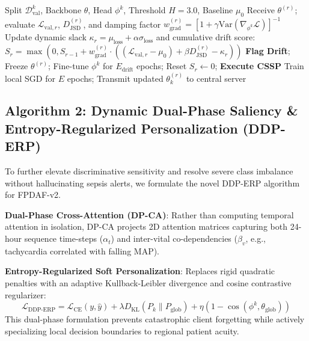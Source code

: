 \documentclass{llncs}
\begin{document}
\begin{algorithm}[t]
\caption{AD-CUSUM Drift Detection \& CSSP Execution}
\label{alg:ad_cusum}
\begin{algorithmic}[1]
\footnotesize
\REQUIRE Split $\mathcal{D}_{\text{val}}^k$, Backbone $\theta$, Head $\phi^k$, Threshold $H = 3.0$, Baseline $\mu_0$
    \STATE Receive $\theta^{(r)}$; evaluate $\mathcal{L}_{\text{val}, r}$, $D_{\text{JSD}}^{(r)}$, and damping factor $w_{\text{grad}}^{(r)} = [1 + \gamma \text{Var}(\nabla_{\phi^k} \mathcal{L})]^{-1}$
    \STATE Update dynamic slack $\kappa_r = \mu_{\text{loss}} + \alpha \sigma_{\text{loss}}$ and cumulative drift score:
    \STATE \quad $S_r = \max\left(0, S_{r-1} + w_{\text{grad}}^{(r)} \cdot \left((\mathcal{L}_{\text{val}, r} - \mu_0) + \beta D_{\text{JSD}}^{(r)} - \kappa_r\right)\right)$
        \STATE \textbf{Flag Drift}; Freeze $\theta^{(r)}$; Fine-tune $\phi^k$ for $E_{\text{drift}}$ epochs; Reset $S_r \leftarrow 0$; \textbf{Execute CSSP}
    \ELSE
        \STATE Train local SGD for $E$ epochs; Transmit updated $\theta_k^{(r)}$ to central server
    \ENDIF
\ENDFOR
\end{algorithmic}
\end{algorithm}

\subsection{Algorithm 2: Dynamic Dual-Phase Saliency \& Entropy-Regularized Personalization (DDP-ERP)}
To further elevate discriminative sensitivity and resolve severe class imbalance without hallucinating sepsis alerts, we formulate the novel DDP-ERP algorithm for FPDAF-v2. 

\noindent\textbf{Dual-Phase Cross-Attention (DP-CA)}: Rather than computing temporal attention in isolation, DP-CA projects 2D attention matrices capturing both 24-hour sequence time-steps ($\alpha_t$) and inter-vital co-dependencies ($\beta_v$, e.g., tachycardia correlated with falling MAP). 

\noindent\textbf{Entropy-Regularized Soft Personalization}: Replaces rigid quadratic penalties with an adaptive Kullback-Leibler divergence and cosine contrastive regularizer:
\begin{equation}
\mathcal{L}_{\text{DDP-ERP}} = \mathcal{L}_{\text{CE}}(y, \hat{y}) + \lambda D_{\text{KL}}\left(P_k \parallel P_{\text{glob}}\right) + \eta \left(1 - \cos(\phi^k, \theta_{\text{glob}})\right)
\label{eq:ddp_erp}
\end{equation}
This dual-phase formulation prevents catastrophic client forgetting while actively specializing local decision boundaries to regional patient acuity.
\end{document}

